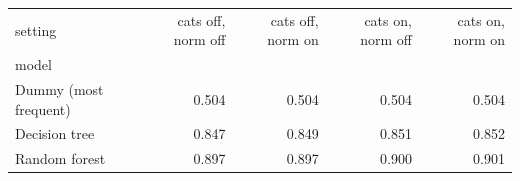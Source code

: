 \begin{tabular}{lrrrr}
\toprule
setting & cats off, norm off & cats off, norm on & cats on, norm off & cats on, norm on \\
model &  &  &  &  \\
\midrule
Dummy (most frequent) & 0.504 & 0.504 & 0.504 & 0.504 \\
Decision tree & 0.847 & 0.849 & 0.851 & 0.852 \\
Random forest & 0.897 & 0.897 & 0.900 & 0.901 \\
\bottomrule
\end{tabular}
